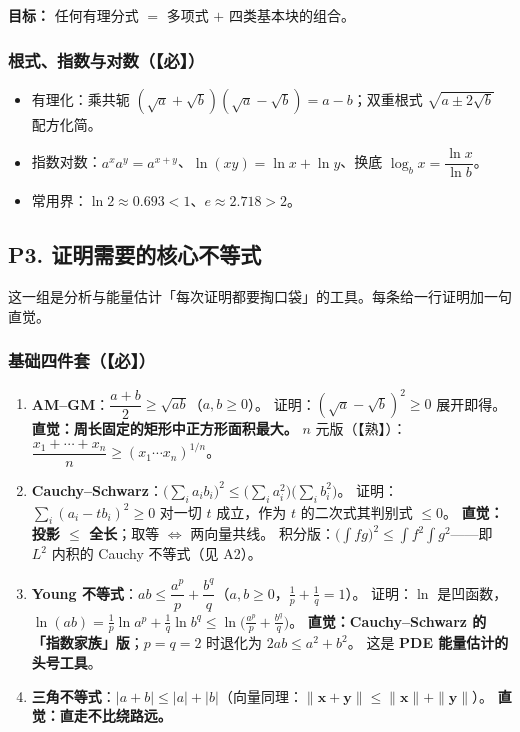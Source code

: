 \textbf{目标：} 任何有理分式 $=$ 多项式 $+$ 四类基本块的组合。

\subsubsection{根式、指数与对数（【必】）}

\begin{itemize}
  \item 有理化：乘共轭 $(\sqrt a+\sqrt b)(\sqrt a-\sqrt b)=a-b$；双重根式 $\sqrt{a\pm 2\sqrt b}$ 配方化简。
  \item 指数对数：$a^xa^y=a^{x+y}$、$\ln(xy)=\ln x+\ln y$、换底 $\log_b x=\dfrac{\ln x}{\ln b}$。
  \item 常用界：$\ln 2\approx0.693<1$、$e\approx2.718>2$。
\end{itemize}

\subsection{P3. 证明需要的核心不等式}

这一组是分析与能量估计「每次证明都要掏口袋」的工具。每条给一行证明加一句直觉。

\subsubsection{基础四件套（【必】）}

\begin{enumerate}
  \item \textbf{AM--GM}：$\dfrac{a+b}{2}\ge\sqrt{ab}$（$a,b\ge0$）。
        证明：$(\sqrt a-\sqrt b)^2\ge0$ 展开即得。
        \textbf{直觉：周长固定的矩形中正方形面积最大。}
        $n$ 元版（【熟】）：$\dfrac{x_1+\cdots+x_n}{n}\ge(x_1\cdots x_n)^{1/n}$。
  \item \textbf{Cauchy--Schwarz}：$\Big(\sum_i a_ib_i\Big)^2\le\Big(\sum_i a_i^2\Big)\Big(\sum_i b_i^2\Big)$。
        证明：$\sum_i(a_i-tb_i)^2\ge0$ 对一切 $t$ 成立，作为 $t$ 的二次式其判别式 $\le0$。
        \textbf{直觉：投影 $\le$ 全长}；取等 $\iff$ 两向量共线。
        积分版：$\big(\int fg\big)^2\le\int f^2\int g^2$——即 $L^2$ 内积的 Cauchy 不等式（见 A2）。
  \item \textbf{Young 不等式}：$ab\le\dfrac{a^p}{p}+\dfrac{b^q}{q}$（$a,b\ge0$，$\frac1p+\frac1q=1$）。
        证明：$\ln$ 是凹函数，
        $\ln(ab)=\frac1p\ln a^p+\frac1q\ln b^q\le\ln\!\Big(\frac{a^p}{p}+\frac{b^q}{q}\Big)$。
        \textbf{直觉：Cauchy--Schwarz 的「指数家族」版}；$p=q=2$ 时退化为 $2ab\le a^2+b^2$。
        这是 \textbf{PDE 能量估计的头号工具}。
  \item \textbf{三角不等式}：$|a+b|\le|a|+|b|$（向量同理：$\|\mathbf{x}+\mathbf{y}\|\le\|\mathbf{x}\|+\|\mathbf{y}\|$）。
        \textbf{直觉：直走不比绕路远。}
\end{enumerate}

